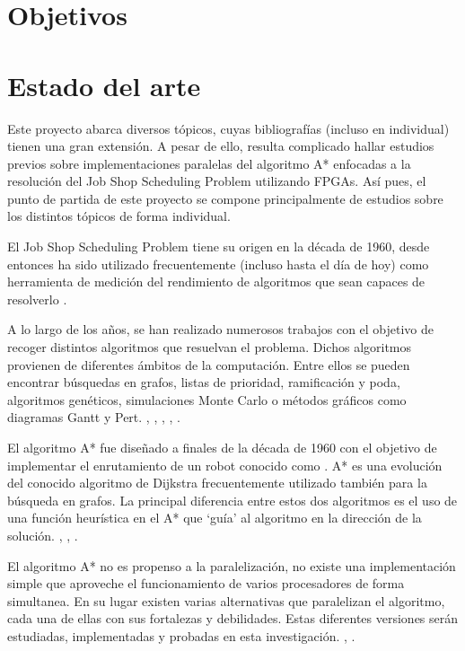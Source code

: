 
\section{Objetivos}

\section{Estado del arte}

Este proyecto abarca diversos tópicos, cuyas bibliografías
(incluso en individual) tienen una gran extensión.
A pesar de ello, resulta complicado hallar estudios previos sobre implementaciones
paralelas del algoritmo A* enfocadas a la resolución del Job Shop Scheduling Problem
utilizando FPGAs.
Así pues, el punto de partida de este proyecto
se compone principalmente de estudios
sobre los distintos tópicos de forma individual.

El Job Shop Scheduling Problem tiene su origen en la década de 1960,
desde entonces ha sido utilizado frecuentemente (incluso hasta el día de hoy)
como herramienta de medición del rendimiento de algoritmos que sean 
capaces de resolverlo \cite{Man67}.

A lo largo de los años, se han realizado numerosos trabajos con el objetivo
de recoger distintos algoritmos que resuelvan el problema.
Dichos algoritmos provienen de diferentes ámbitos de la computación.
Entre ellos se pueden encontrar búsquedas en grafos,
listas de prioridad, ramificación y poda, algoritmos genéticos,
simulaciones Monte Carlo o
métodos gráficos como diagramas Gantt y Pert.
\cite{Yan77}, \cite{Nil69}, \cite{KTM99}, \cite{BC22}, \cite{Pin08}.

El algoritmo A* fue diseñado a finales de la década de 1960
con el objetivo de implementar el enrutamiento de un robot
conocido como  \cite{Nil84}.
A* es una evolución del conocido algoritmo de Dijkstra
frecuentemente utilizado también para la búsqueda en grafos.
La principal diferencia entre estos dos algoritmos es el
uso de una función heurística en el A* que `guía' al algoritmo
en la dirección de la solución.
\cite{HNR68}, \cite{MSV13}, \cite{Kon14}.

El algoritmo A* no es propenso a la paralelización,
no existe una implementación simple que aproveche el funcionamiento de
varios procesadores de forma simultanea.
En su lugar existen varias alternativas que paralelizan el algoritmo,
cada una de ellas con sus fortalezas y debilidades.
Estas diferentes versiones serán estudiadas, implementadas y
probadas en esta investigación.
\cite{Zag17}, \cite{WH16}.

